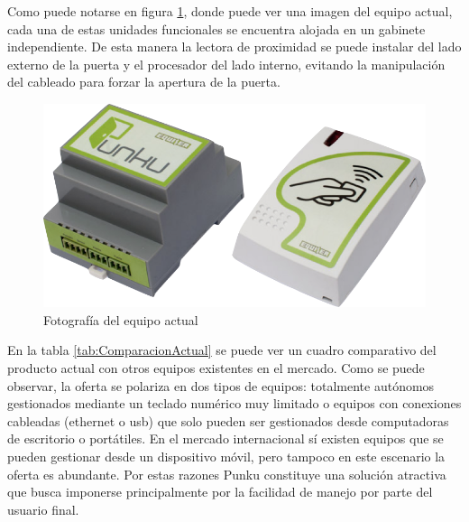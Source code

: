 Como puede notarse en figura \ref{fig:EquipoActual}, donde puede ver una imagen del equipo actual, cada una de estas unidades funcionales se encuentra alojada en un gabinete independiente. De esta manera la lectora de proximidad se puede instalar del lado externo de la puerta y el procesador del lado interno, evitando la manipulación del cableado para forzar la apertura de la puerta.

\begin{figure}[ht]
	\centering
	\vspace{3mm}
	\includegraphics[scale=.5]{./Figures/EquipoActual.png}
	\caption{Fotografía del equipo actual}
	\label{fig:EquipoActual}
\end{figure}

En la tabla \ref{tab:ComparacionActual} se puede ver un cuadro comparativo del producto actual con otros equipos existentes en el mercado. Como se puede observar, la oferta se polariza en dos tipos de equipos: totalmente autónomos gestionados mediante un teclado numérico muy limitado o equipos con conexiones cableadas (ethernet o usb) que solo pueden ser gestionados desde computadoras de escritorio o portátiles. En el mercado internacional sí existen equipos que se pueden gestionar desde un dispositivo móvil, pero tampoco en este escenario la oferta es abundante. Por estas razones Punku constituye una solución atractiva que busca imponerse principalmente por la facilidad de manejo por parte del usuario final. 

